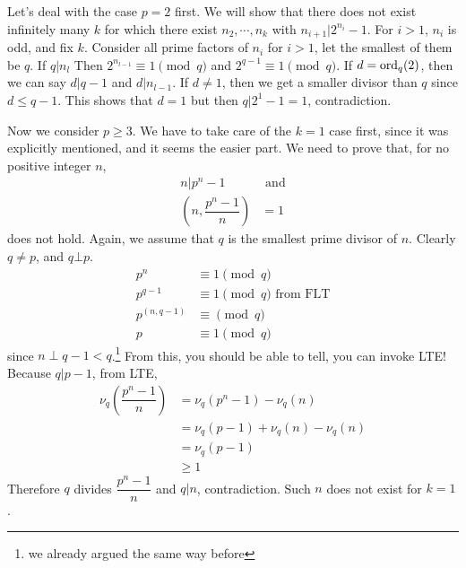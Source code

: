 \documentclass[problems.tex]{subfile}
\begin{document}
	\begin{solution}
		Let's deal with the case $p=2$ first. We will show that there does not exist infinitely many $k$ for which there exist $n_2,\cdots,n_k$ with $n_{i+1}|2^{n_i}-1$. For $i>1$, $n_i$ is odd, and fix $k$. Consider all prime factors of $n_i$ for $i>1$, let the smallest of them be $q$. If $q|n_{l}$ Then $2^{n_{l-1}}\equiv1\pmod q$ and $2^{q-1}\equiv1\pmod q$. If $d=\operatorname{ord}_q(2)$, then we can say $d|q-1$ and $d|n_{l-1}$. If $d\neq1$, then we get a smaller divisor than $q$ since $d\leq q-1$. This shows that $d=1$ but then $q|2^1-1=1$, contradiction.
		
		Now we consider $p\geq3$. We have to take care of the $k=1$ case first, since it was explicitly mentioned, and it seems the easier part. We need to prove that, for no positive integer $n$,
			\begin{align*}
				n  |p^n-1 & \text{ and}\\
				\left(n,\dfrac{p^n-1}{n}\right) & = 1
			\end{align*}
		does not hold. Again, we assume that $q$ is the smallest prime divisor of $n$. Clearly $q\neq p$, and $q\bot p$.
			\begin{align*}
				p^n & \equiv1\pmod q\\
				p^{q-1}& \equiv1\pmod q\text{ from FLT}\\
				p^{(n,q-1)} & \equiv\pmod q\\
				p & \equiv1\pmod q
			\end{align*}
		since $n\perp q-1<q$.\footnote{we already argued the same way before} From this, you should be able to tell, you can invoke LTE! Because $q|p-1$, from LTE,
			\begin{align*}
				\nu_q\left(\dfrac{p^n-1}{n}\right)  & = \nu_q\left(p^n-1\right)-\nu_q(n)\\
													& = \nu_q(p-1)+\nu_q(n)-\nu_q(n)\\
													& = \nu_q(p-1)\\
													&\geq1
			\end{align*}
		Therefore $q$ divides $\dfrac{p^n-1}{n}$ and $q|n$, contradiction. Such $n$ does not exist for $k=1$.
		

\end{solution}
\end{document}
